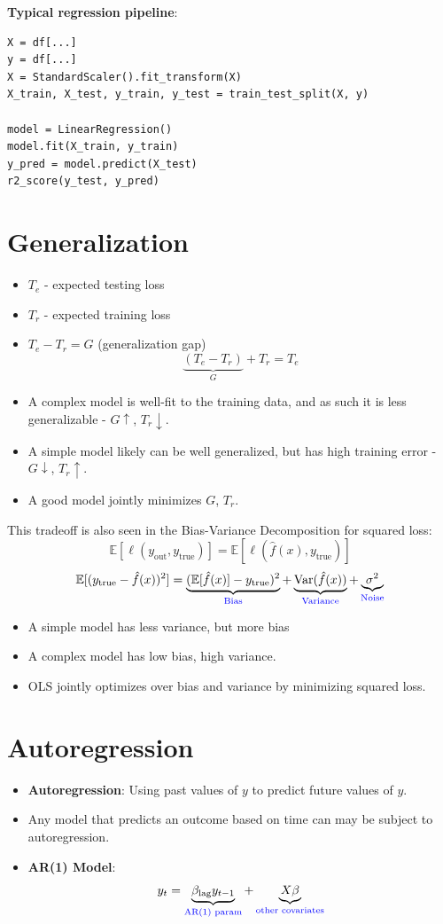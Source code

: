 \documentclass{article}
\begin{document}
\textbf{Typical regression pipeline}:
\begin{verbatim}
X = df[...]
y = df[...]
X = StandardScaler().fit_transform(X)
X_train, X_test, y_train, y_test = train_test_split(X, y)

model = LinearRegression()
model.fit(X_train, y_train)
y_pred = model.predict(X_test)
r2_score(y_test, y_pred)
\end{verbatim}

\section{Generalization}
\begin{itemize}
    \item $T_e$ - expected testing loss
    \item $T_r$ - expected training loss
    \item $T_e - T_r = G$ (generalization gap)
    \[
        \underbrace{(T_e - T_r)}_{G} + T_r = T_e
    \]
    \item A complex model is well-fit to the training data, and as such it is less generalizable - $G \uparrow$, $T_r \downarrow$.
    \item A simple model likely can be well generalized, but has high training error - $G \downarrow$, $T_r \uparrow$.
    \item A good model jointly minimizes $G$, $T_r$.
\end{itemize}

This tradeoff is also seen in the Bias-Variance Decomposition for squared loss:
\[
    \mathbb{E}[\ell(y_{\text{out}}, y_{\text{true}})] = \mathbb{E}[\ell(\hat{f}(x), y_{\text{true}})]
\]
\[
    \mathbb{E}[(y_{\text{true}} - \hat{f}(x))^2] = \underbrace{(\mathbb{E}[\hat{f}(x)] - y_{\text{true}})^2}_{\textcolor{blue}{\text{Bias}}} + \underbrace{\text{Var}(\hat{f}(x))}_{\textcolor{blue}{\text{Variance}}} + \underbrace{\sigma^2}_{\textcolor{blue}{\text{Noise}}}
\]

\begin{itemize}
    \item A simple model has less variance, but more bias
    \item A complex model has low bias, high variance.
    \item OLS jointly optimizes over bias and variance by minimizing squared loss.
\end{itemize}

\section{Autoregression}
\begin{itemize}
    \item \textbf{Autoregression}: Using past values of $y$ to predict future values of $y$.
    \item Any model that predicts an outcome based on time can may be subject to autoregression.
    \item \textbf{AR(1) Model}:
        \[
            y_t = \underbrace{\beta_{\text{lag}}y_{t-1}}_{\textcolor{blue}{\text{AR(1) param}}} + \underbrace{X\beta}_{\textcolor{blue}{\text{other covariates}}}
        \]
\end{itemize}
\end{document}
